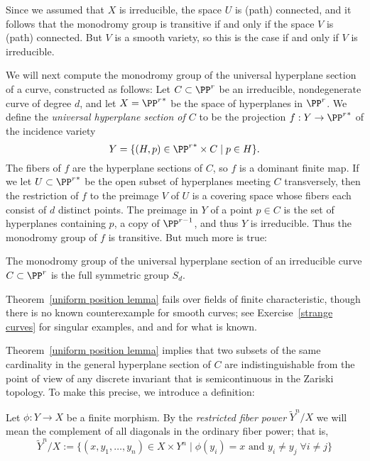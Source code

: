 Since we assumed that $X$ is irreducible, the space $U$ is (path) connected, and it follows that the monodromy group is transitive if and only if the space $V$ is (path) connected. But $V$ is a smooth
variety, so this is the case if and only if $V$ is irreducible.

We will next compute the monodromy group of the  universal hyperplane section of a curve, constructed as follows:
Let $C \subset \PP^r$ be an irreducible, nondegenerate curve of degree $d$, and let $X = {\PP^r}^*$ be the space of hyperplanes in $\PP^r$. We define the \emph{universal hyperplane section of $C$} to be the projection  $f: Y\to {\PP^r}^*$ of the incidence variety
$$
Y = \{ (H, p) \in {\PP^r}^* \times C \mid p \in H \}.
$$
The fibers of $f$ are the hyperplane
sections of $C$, so $f$ is a dominant finite map. If we let $U\subset {\PP^r}^*$ be the open subset of hyperplanes
meeting $C$ transversely, then the restriction of $f$ to the preimage $V$ of $U$ is a covering space
whose fibers each consist of $d$ distinct points. The preimage in $Y$ of a point $p\in C$ is the set of hyperplanes containing
$p$, a copy of $\PP^{r-1}$, and thus $Y$ is irreducible. Thus the monodromy group of $f$ is transitive. But much more is true:

\begin{theorem}\label{uniform position lemma}
The monodromy group of the universal hyperplane section of an irreducible curve $C \subset \PP^r$ is the full symmetric group $S_d$.
\end{theorem}

Theorem~\ref{uniform position lemma} fails over fields of finite characteristic, though there is no known counterexample for smooth curves; see Exercise~\ref{strange curves} for singular examples, and \cite{Rathmann} and \cite{Kadets} for what is known. 

Theorem~\ref{uniform position lemma} implies that two subsets of the same cardinality in the general hyperplane section of $C$
are indistinguishable from the point of view of any discrete invariant that is semicontinuous in the Zariski topology. To make this precise, we introduce a definition:

\begin{definition}
Let $\phi : Y \to X$ be a finite morphism. By the \emph{restricted fiber power} $\tilde Y^n/X$ we will mean the complement of all diagonals in the ordinary fiber power; that is,
$$
\tilde Y^n/X := \{ (x, y_1,\dots, y_n) \in X \times Y^n \mid \phi(y_i) = x \text{ and } y_i \neq y_j \; \forall i \neq j \}
$$
\end{definition}

